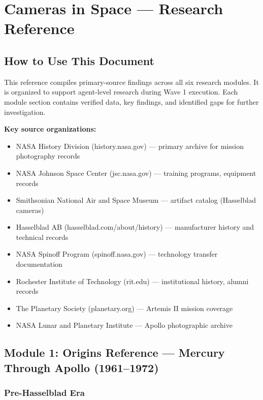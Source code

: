 \documentclass[11pt,letterpaper]{article}
\newcommand{\stageheader}[2]{%
  \noindent\colorbox{#2}{\makebox[\textwidth][l]{%
    \textcolor{white}{\bfseries\sffamily\hspace{6pt}#1\hspace{6pt}}}}%
  \vspace{0.5em}\par%
}
\begin{document}
\newpage
\stageheader{STAGE 2 --- RESEARCH REFERENCE}{secondary}

\section{Cameras in Space --- Research Reference}

\subsection{How to Use This Document}

This reference compiles primary-source findings across all six research modules. It is organized to support agent-level research during Wave 1 execution. Each module section contains verified data, key findings, and identified gaps for further investigation.

\textbf{Key source organizations:}
\begin{itemize}[leftmargin=1.5em]
  \item NASA History Division (history.nasa.gov) --- primary archive for mission photography records
  \item NASA Johnson Space Center (jsc.nasa.gov) --- training programs, equipment records
  \item Smithsonian National Air and Space Museum --- artifact catalog (Hasselblad cameras)
  \item Hasselblad AB (hasselblad.com/about/history) --- manufacturer history and technical records
  \item NASA Spinoff Program (spinoff.nasa.gov) --- technology transfer documentation
  \item Rochester Institute of Technology (rit.edu) --- institutional history, alumni records
  \item The Planetary Society (planetary.org) --- Artemis II mission coverage
  \item NASA Lunar and Planetary Institute --- Apollo photographic archive
\end{itemize}

\subsection{Module 1: Origins Reference --- Mercury Through Apollo (1961--1972)}

\subsubsection{Pre-Hasselblad Era}
\end{document}
